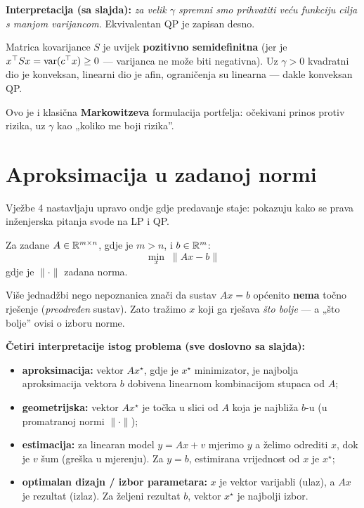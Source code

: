 \textbf{Interpretacija (sa slajda):} \emph{za velik $\gamma$ spremni smo
prihvatiti veću funkciju cilja s manjom varijancom.} Ekvivalentan QP je zapisan
desno.

\begin{napomena}
Matrica kovarijance $S$ je uvijek \textbf{pozitivno semidefinitna} (jer je
$x^{\top} Sx = \operatorname{var}(c^{\top} x) \ge 0$ --- varijanca ne može biti
negativna). Uz $\gamma > 0$ kvadratni dio je konveksan, linearni dio je afin,
ograničenja su linearna --- dakle konveksan QP.

Ovo je i klasična \textbf{Markowitzeva} formulacija portfelja: očekivani
prinos protiv rizika, uz $\gamma$ kao „koliko me boji rizika”.
\end{napomena}

\section{Aproksimacija u zadanoj normi}
\label{sec:aproksimacija}

Vježbe 4 nastavljaju upravo ondje gdje predavanje staje: pokazuju kako se
prava inženjerska pitanja svode na LP i QP.

\begin{definicija}
Za zadane $A \in \mathbb{R}^{m\times n}$, gdje je $m > n$, i $b \in \mathbb{R}^m$:
\[
\min_x \; \|Ax - b\|
\]
gdje je $\|\cdot\|$ zadana norma.
\end{definicija}

\begin{napomena}[zašto $m > n$]
Više jednadžbi nego nepoznanica znači da sustav $Ax = b$ općenito \textbf{nema}
točno rješenje (\emph{preodređen} sustav). Zato tražimo $x$ koji ga rješava
\emph{što bolje} --- a „što bolje” ovisi o izboru norme.
\end{napomena}

\textbf{Četiri interpretacije istog problema (sve doslovno sa slajda):}

\begin{itemize}
  \item \textbf{aproksimacija:} vektor $Ax^\star$, gdje je $x^\star$
        minimizator, je najbolja aproksimacija vektora $b$ dobivena linearnom
        kombinacijom stupaca od $A$;
  \item \textbf{geometrijska:} vektor $Ax^\star$ je točka u slici od $A$ koja je
        najbliža $b$-u (u promatranoj normi $\|\cdot\|$);
  \item \textbf{estimacija:} za linearan model $y = Ax + v$ mjerimo $y$ a želimo
        odrediti $x$, dok je $v$ šum (greška u mjerenju). Za $y = b$, estimirana
        vrijednost od $x$ je $x^\star$;
  \item \textbf{optimalan dizajn / izbor parametara:} $x$ je vektor varijabli
        (ulaz), a $Ax$ je rezultat (izlaz). Za željeni rezultat $b$, vektor
        $x^\star$ je najbolji izbor.
\end{itemize}

